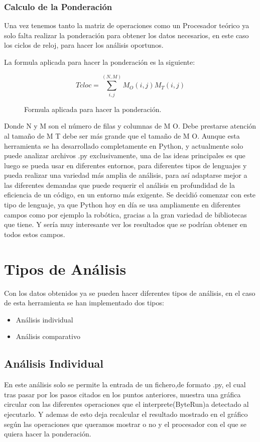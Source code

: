 \subsubsection{Calculo de la Ponderación}
Una vez tenemos tanto la matriz de operaciones como un Procesador teórico ya solo falta realizar la ponderación para obtener los datos necesarios, en este caso los ciclos de reloj, para hacer los análisis oportunos. 

La formula aplicada para hacer la ponderación es la siguiente:

\begin{figure}[H]
\[
Tcloc=\sum_{i,j}^{(N,M)} M_{O}(i,j)M_{T}(i,j)
\]
\caption{Formula aplicada para hacer la ponderación.}
\end{figure}


Donde N y M son el número de filas y columnas de M O. Debe prestarse atención al tamaño de M T debe ser más grande que el tamaño de M O.
Aunque esta herramienta se ha desarrollado completamente en Python, y actualmente solo puede analizar archivos .py exclusivamente, una de las ideas principales es que luego se pueda usar en diferentes entornos, para diferentes tipos de lenguajes y pueda realizar una variedad más amplia de análisis, para así adaptarse mejor a las diferentes demandas que puede requerir el análisis en profundidad de la eficiencia de un código, en un entorno más exigente. Se decidió comenzar con este tipo de lenguaje, ya que Python hoy en día se usa ampliamente en diferentes campos como por ejemplo la robótica, gracias a la gran variedad de bibliotecas que tiene. Y sería muy interesante ver los resultados que se podrían obtener en todos estos campos.


\section{Tipos de Análisis}
Con los datos obtenidos ya se pueden hacer diferentes tipos de análisis, en el caso de esta herramienta se han implementado dos tipos:
\begin{itemize}
	\item Análisis individual
	\item Análisis comparativo
\end{itemize}
 

\subsection{Análisis Individual}
En este análisis solo se permite la entrada de un fichero,de formato .py, el cual tras pasar por los pasos citados en los puntos anteriores, muestra una gráfica circular con las diferentes operaciones que el interprete(ByteRun)a detectado al ejecutarlo. Y ademas de esto deja recalcular el resultado mostrado en el gráfico según las operaciones que queramos mostrar o no y el procesador con el que se quiera hacer la ponderación.\\

